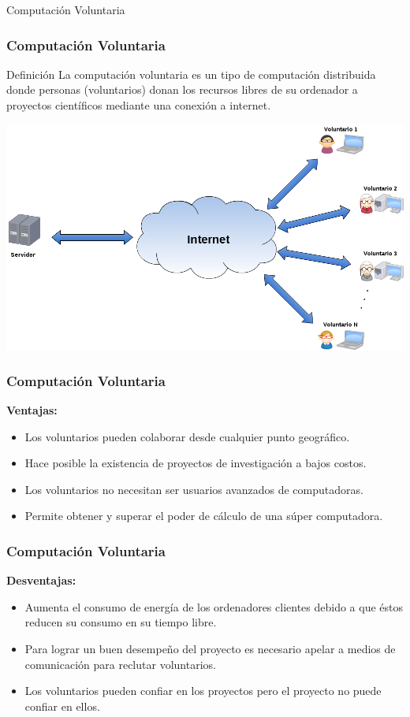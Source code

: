 \begin{subsection}{Computación Voluntaria}

	\begin{frame}\frametitle{Computación Voluntaria}
		\begin{block}{Definición}
			La computación voluntaria es un tipo de computación distribuida donde personas (voluntarios) donan los recursos libres de 
			su ordenador a proyectos científicos mediante una conexión a internet.
		\end{block}
		
		\begin{center}
			\includegraphics[scale=.22]{images/graf-comp-volunt.png}
		\end{center}
	\end{frame}

	\begin{frame}\frametitle{Computación Voluntaria}
		\textbf{Ventajas:\\[.5cm]}
		\begin{itemize}
			\addtolength{\itemsep}{3mm}
		    \item Los voluntarios pueden colaborar desde cualquier punto geográfico.
		    \item Hace posible la existencia de proyectos de investigación a bajos costos.
		    \item Los voluntarios no necesitan ser usuarios avanzados de computadoras.
		    \item Permite obtener y superar el poder de cálculo de una súper computadora.
		\end{itemize}
	\end{frame}

	\begin{frame}\frametitle{Computación Voluntaria}
		\textbf{Desventajas:\\[.5cm]}
		\begin{itemize}
		\addtolength{\itemsep}{3mm}
			\item Aumenta el consumo de energía de los ordenadores clientes debido a que éstos reducen su consumo en su tiempo libre.
			\item Para lograr un buen desempeño del proyecto es necesario apelar a medios de comunicación para reclutar voluntarios.
			\item Los voluntarios pueden confiar en los proyectos pero el proyecto no puede confiar en ellos.
		\end{itemize}
	\end{frame}
	

\end{subsection}
